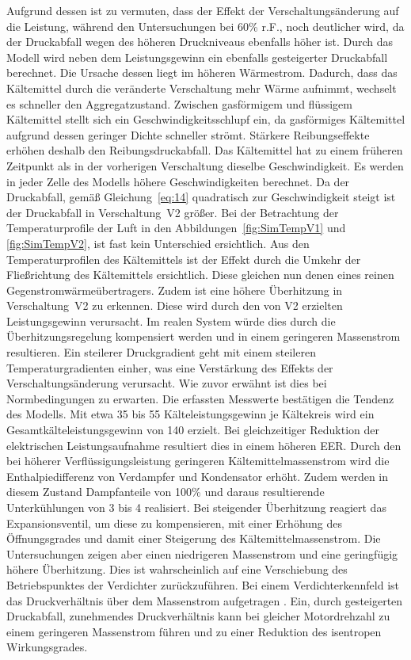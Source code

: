 Aufgrund dessen ist zu vermuten, dass der Effekt der Verschaltungsänderung auf die Leistung, während den Untersuchungen bei \unit{60}{\%} r.F., noch deutlicher wird, da der Druckabfall wegen des höheren Druckniveaus ebenfalls höher ist. Durch das Modell wird neben dem Leistungsgewinn ein ebenfalls gesteigerter Druckabfall berechnet. Die Ursache dessen liegt im höheren Wärmestrom. Dadurch, dass das Kältemittel durch die veränderte Verschaltung mehr Wärme aufnimmt, wechselt es schneller den Aggregatzustand. Zwischen gasförmigem und flüssigem Kältemittel stellt sich ein Geschwindigkeitsschlupf ein, da gasförmiges Kältemittel aufgrund dessen geringer Dichte schneller strömt. Stärkere Reibungseffekte erhöhen deshalb den Reibungsdruckabfall. Das Kältemittel hat zu einem früheren Zeitpunkt als in der vorherigen Verschaltung dieselbe Geschwindigkeit. Es werden in jeder Zelle des Modells höhere Geschwindigkeiten berechnet. Da der Druckabfall, gemäß Gleichung~\ref{eq:14} quadratisch zur Geschwindigkeit steigt ist der Druckabfall in Verschaltung~V2 größer. \newline
Bei der Betrachtung der Temperaturprofile der Luft in den Abbildungen~\ref{fig:SimTempV1} und \ref{fig:SimTempV2}, ist fast kein Unterschied ersichtlich. Aus den Temperaturprofilen des Kältemittels ist der Effekt durch die Umkehr der Fließrichtung des Kältemittels ersichtlich. Diese gleichen nun denen eines reinen Gegenstromwärmeübertragers. Zudem ist eine höhere Überhitzung in Verschaltung~V2 zu erkennen. Diese wird durch den von V2 erzielten Leistungsgewinn verursacht. Im realen System würde dies durch die Überhitzungsregelung kompensiert werden und in einem geringeren Massenstrom resultieren. Ein steilerer Druckgradient geht mit einem steileren Temperaturgradienten einher, was eine Verstärkung des Effekts der Verschaltungsänderung verursacht. Wie zuvor erwähnt ist dies bei Normbedingungen zu erwarten. \newline
Die erfassten Messwerte bestätigen die Tendenz des Modells. Mit etwa \unit{35}{\watt} bis \unit{55}{\watt} Kälteleistungsgewinn je Kältekreis wird ein Gesamtkälteleistungsgewinn von \unit{140}{\watt} erzielt. Bei gleichzeitiger Reduktion der elektrischen Leistungsaufnahme resultiert dies in einem höheren EER. Durch den bei höherer Verflüssigungsleistung geringeren Kältemittelmassenstrom wird die Enthalpiedifferenz von Verdampfer und Kondensator erhöht. Zudem werden in diesem Zustand Dampfanteile von \unit{100}{\%} und daraus resultierende Unterkühlungen von \unit{3}{\kelvin} bis \unit{4}{\kelvin} realisiert.
Bei steigender Überhitzung reagiert das Expansionsventil, um diese zu kompensieren, mit einer Erhöhung des Öffnungsgrades und damit einer Steigerung des Kältemittelmassenstrom. Die Untersuchungen zeigen aber einen niedrigeren Massenstrom und eine geringfügig höhere Überhitzung. Dies ist wahrscheinlich auf eine Verschiebung des Betriebspunktes der Verdichter zurückzuführen. Bei einem Verdichterkennfeld ist das Druckverhältnis über dem Massenstrom aufgetragen \cite{Wilke.2005}. Ein, durch gesteigerten Druckabfall, zunehmendes Druckverhältnis kann bei gleicher Motordrehzahl zu einem geringeren Massenstrom führen und zu einer Reduktion des isentropen Wirkungsgrades. \newline
